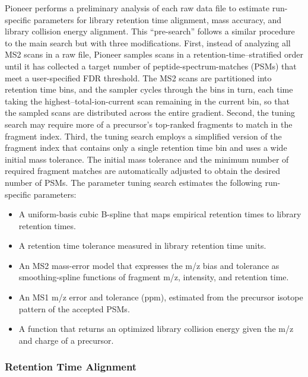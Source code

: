 \documentclass[pdflatex,sn-nature]{sn-jnl}
\begin{document}
Pioneer performs a preliminary analysis of each raw data file to estimate run-specific parameters for library retention time alignment, mass accuracy, and library collision energy alignment. This ``pre-search'' follows a similar procedure to the main search but with three modifications. First, instead of analyzing all MS2 scans in a raw file, Pioneer samples scans in a retention-time--stratified order until it has collected a target number of peptide-spectrum-matches (PSMs) that meet a user-specified FDR threshold. The MS2 scans are partitioned into retention time bins, and the sampler cycles through the bins in turn, each time taking the highest--total-ion-current scan remaining in the current bin, so that the sampled scans are distributed across the entire gradient. Second, the tuning search may require more of a precursor's top-ranked fragments to match in the fragment index. Third, the tuning search employs a simplified version of the fragment index that contains only a single retention time bin and uses a wide initial mass tolerance. The initial mass tolerance and the minimum number of required fragment matches are automatically adjusted to obtain the desired number of PSMs. The parameter tuning search estimates the following run-specific parameters:

 \begin{itemize}
    \item A uniform-basis cubic B-spline that maps empirical retention times to library retention times.
    \item A retention time tolerance measured in library retention time units. 
    \item An MS2 mass-error model that expresses the m/z bias and tolerance as smoothing-spline functions of fragment m/z, intensity, and retention time.
    \item An MS1 m/z error and tolerance (ppm), estimated from the precursor isotope pattern of the accepted PSMs.
    \item A function that returns an optimized library collision energy given the m/z and charge of a precursor.
\end{itemize}



\subsubsection{Retention Time Alignment}\label{sec:rt_align}
\end{document}
